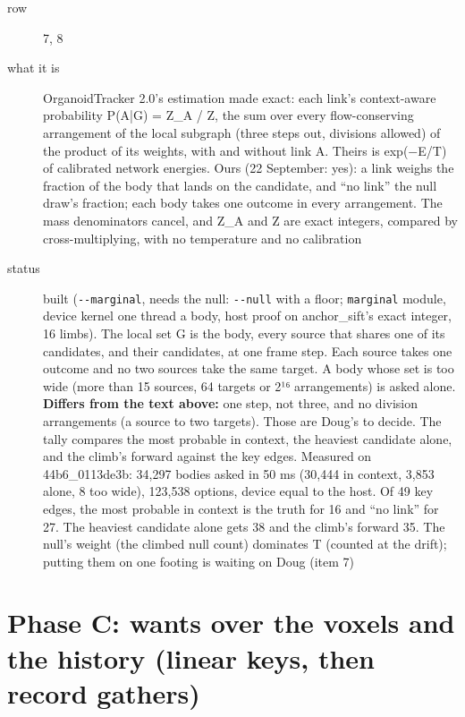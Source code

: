 \begin{description}
\item[{row}] 7, 8
\item[{what it is}] OrganoidTracker 2.0's estimation made exact: each link's context-aware probability P(A|G) = Z\_\allowbreak{}A / Z, the sum over every flow-conserving arrangement of the local subgraph (three steps out, divisions allowed) of the product of its weights, with and without link A. Theirs is exp(−E/T) of calibrated network energies. Ours (22 September: yes): a link weighs the fraction of the body that lands on the candidate, and “no link” the null draw's fraction; each body takes one outcome in every arrangement. The mass denominators cancel, and Z\_\allowbreak{}A and Z are exact integers, compared by cross-multiplying, with no temperature and no calibration
\item[{status}] built (\texttt{-\allowbreak{}-\allowbreak{}marginal}, needs the null: \texttt{-\allowbreak{}-\allowbreak{}null} with a floor; \texttt{marginal} module, device kernel one thread a body, host proof on anchor\_\allowbreak{}sift's exact integer, 16 limbs). The local set G is the body, every source that shares one of its candidates, and their candidates, at one frame step. Each source takes one outcome and no two sources take the same target. A body whose set is too wide (more than 15 sources, 64 targets or 2¹⁶ arrangements) is asked alone. \textbf{Differs from the text above:} one step, not three, and no division arrangements (a source to two targets). Those are Doug's to decide. The tally compares the most probable in context, the heaviest candidate alone, and the climb's forward against the key edges. Measured on 44b6\_\allowbreak{}0113de3b: 34,297 bodies asked in 50 ms (30,444 in context, 3,853 alone, 8 too wide), 123,538 options, device equal to the host. Of 49 key edges, the most probable in context is the truth for 16 and “no link” for 27. The heaviest candidate alone gets 38 and the climb's forward 35. The null's weight (the climbed null count) dominates T (counted at the drift); putting them on one footing is waiting on Doug (item 7)
\end{description}

\section{\texorpdfstring{Phase C: wants over the voxels and the history (linear keys, then record gathers)}{Phase C: wants over the voxels and the history (linear keys, then record gathers)}}

